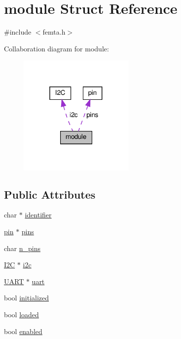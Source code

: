 \hypertarget{structmodule}{}\section{module Struct Reference}
\label{structmodule}


{\ttfamily \#include $<$femta.\+h$>$}



Collaboration diagram for module\+:\nopagebreak
\begin{figure}[H]
\begin{center}
\leavevmode
\includegraphics[width=160pt]{structmodule__coll__graph}
\end{center}
\end{figure}
\subsection*{Public Attributes}
\begin{DoxyCompactItemize}
\item 
char $\ast$ \hyperlink{structmodule_ab82c1bea579b33b2855bd99cc6277c8a}{identifier}
\item 
\hyperlink{structpin}{pin} $\ast$ \hyperlink{structmodule_a3a758f16bbf56b5df5bfb1cfd7515fdb}{pins}
\item 
char \hyperlink{structmodule_a02c9f82d64608b57e23ec9b6d8e40442}{n\+\_\+pins}
\item 
\hyperlink{structI2C}{I2C} $\ast$ \hyperlink{structmodule_aedc78b570290808d3e47d2bb2dadd155}{i2c}
\item 
\hyperlink{femta_8h_a13b3221f36ef9cb93c995303f10fed50}{U\+A\+RT} $\ast$ \hyperlink{structmodule_af74c4f29b898b255838d6b18731fa565}{uart}
\item 
bool \hyperlink{structmodule_a9b7ebb7008b8bc642090447151895cae}{initialized}
\item 
bool \hyperlink{structmodule_a321b33f91b9b132f34d66fef4243e201}{loaded}
\item 
bool \hyperlink{structmodule_ac6281658345d8c0ebd189f10feca7f8c}{enabled}
\end{DoxyCompactItemize}


